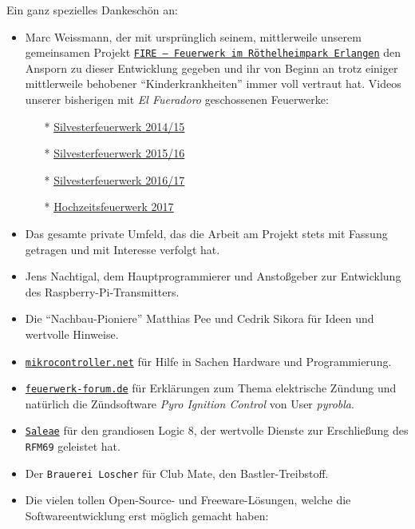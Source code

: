 \documentclass[paper=a4, parskip, numbers=noenddot, toc=listof, headsepline]{scrbook}
\newcommand{\pic}{\emph{Pyro Ignition Control}}
\newcommand{\anlage}{\emph{El Fueradoro}}
\begin{document}
		 Ein ganz spezielles Dankeschön an:
		 \begin{itemize}
			 \item Marc Weissmann, der mit ursprünglich seinem, mittlerweile unserem gemeinsamen Projekt \href{http://www.facebook.com/FIREErlangen}{\texttt{FIRE~-- Feuerwerk im Röthel\-heim\-park Er\-langen}} den Ansporn zu dieser Entwicklung gegeben und ihr von Beginn an trotz einiger mittlerweile behobener \enquote{Kinderkrankheiten} immer voll vertraut hat. Videos unserer bisherigen mit {\anlage} geschossenen Feuerwerke:
			       \begin{itemize}
				       \item[*] \underline{\href{https://vimeo.com/116115628}{Silvesterfeuerwerk 2014/15}}
				       \item[*] \underline{\href{https://vimeo.com/150594996}{Silvesterfeuerwerk 2015/16}}
				       \item[*] \underline{\href{https://vimeo.com/198168273}{Silvesterfeuerwerk 2016/17}}
				       \item[*] \underline{\href{https://www.youtube.com/watch?v=uPTW1dpsVoU}{Hochzeitsfeuerwerk 2017}}
			       \end{itemize}
			 \item Das gesamte private Umfeld, das die Arbeit am Projekt stets mit Fassung getragen und mit Interesse verfolgt hat.
			 \item Jens Nachtigal, dem Hauptprogrammierer und Anstoßgeber zur Entwicklung des Raspberry-Pi-Transmitters.
			 \item Die \enquote{Nachbau-Pioniere} Matthias Pee und Cedrik Sikora für Ideen und wertvolle Hinweise.
			 \item \href{http://www.mikrocontroller.net}{\texttt{mikrocontroller.net}} für Hilfe in Sachen Hardware und Programmierung.
			 \item \href{http://www.feuerwerk-forum.de}{\texttt{feuerwerk-forum.de}} für Erklärungen zum Thema elektrische Zündung und natürlich die Zündsoftware {\pic} von User \emph{pyrobla}.
			 \item \href{http://www.saleae.com}{\texttt{Saleae}} für den grandiosen Logic 8, der wertvolle Dienste zur Erschließung des \texttt{RFM69} geleistet hat.
			 \item Der \texttt{Brauerei Loscher} für Club Mate, den Bastler-Treibstoff.
			 \item Die vielen tollen Open-Source- und Freeware-Lösungen, welche die Softwareentwicklung erst möglich gemacht haben:
			       \begin{itemize}

\end{itemize}
\end{itemize}
\end{document}
